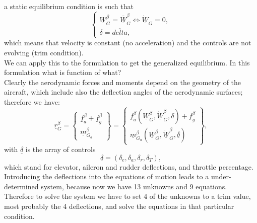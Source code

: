 a static equilibrium condition is such that 
\begin{equation}
\begin{cases}
    

    \underline{W}_G^\beta = \underline{\overline{W}}_G^\beta \Longleftrightarrow \underline{\dot W}_G = 0,\\
    \underline{\delta} = \underline{\overline{delta}},
    
\end{cases}
\end{equation}
which means that velocity is constant (no acceleration) and the controls are not evolving (trim condition).\\
We can apply this to the formulation to get the generalized equilibrium.
In this formulation what is function of what?
\\
Clearly the aerodynamic forces and moments depend on the geometry of the aircraft, which include also the deflection angles of the aerodynamic surfaces; therefore we have:
\begin{equation}
    \underline{r}_G^\beta = \begin{Bmatrix}
        \underline{f}_a^\beta +\underline{f}_g^\beta \\\underline{m}_{G_a}^\beta
    \end{Bmatrix} = \begin{Bmatrix}
        \underline{f}_a^\beta(\underline{W}_G^\beta,\underline{\dot W}_G^\beta,\delta)+\underline{f}_g^\beta \\\underline{m}_{G_a}^\beta(\underline{W}_G^\beta,\underline{\dot W}_G^\beta,\underline{\delta})
    \end{Bmatrix},
\end{equation}
with $\underline{\delta}$ is the array of controls
\begin{equation}
    \underline{\delta} = (\delta_e, \delta_a, \delta_r, \delta_T),
\end{equation}
which stand for elevator, aileron and rudder deflections, and throttle percentage.
\\
Introducing the deflections into the equations of motion leads to a under-determined system, because now we have 13 unknowns and 9 equations. Therefore to solve the system we have to set 4 of the unknowns to a trim value, most probably the 4 deflections, and solve the equations in that particular condition.


